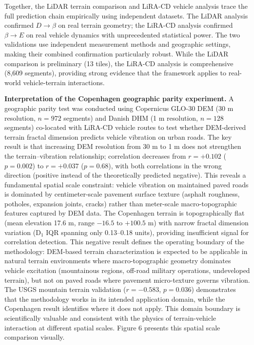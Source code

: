 \documentclass[11pt]{article}
\begin{document}
Together, the LiDAR terrain comparison and LiRA-CD vehicle analysis trace the full prediction chain empirically using independent datasets. The LiDAR analysis confirmed $D \rightarrow \beta$ on real terrain geometry; the LiRA-CD analysis confirmed $\beta \rightarrow E$ on real vehicle dynamics with unprecedented statistical power. The two validations use independent measurement methods and geographic settings, making their combined confirmation particularly robust. While the LiDAR comparison is preliminary (13 tiles), the LiRA-CD analysis is comprehensive (8,609 segments), providing strong evidence that the framework applies to real-world vehicle-terrain interactions.

\textbf{Interpretation of the Copenhagen geographic parity experiment.} A geographic parity test was conducted using Copernicus GLO-30 DEM (30 m resolution, $n=972$ segments) and Danish DHM (1 m resolution, $n=128$ segments) co-located with LiRA-CD vehicle routes to test whether DEM-derived terrain fractal dimension predicts vehicle vibration on urban roads. The key result is that increasing DEM resolution from 30 m to 1 m does not strengthen the terrain--vibration relationship; correlation decreases from $r = +0.102$ ($p = 0.002$) to $r = +0.037$ ($p = 0.68$), with both correlations in the wrong direction (positive instead of the theoretically predicted negative). This reveals a fundamental spatial scale constraint: vehicle vibration on maintained paved roads is dominated by centimeter-scale pavement surface texture (asphalt roughness, potholes, expansion joints, cracks) rather than meter-scale macro-topographic features captured by DEM data. The Copenhagen terrain is topographically flat (mean elevation 17.6 m, range $-16.5$ to $+100.5$ m) with narrow fractal dimension variation (D$_1$ IQR spanning only 0.13--0.18 units), providing insufficient signal for correlation detection. This negative result defines the operating boundary of the methodology: DEM-based terrain characterization is expected to be applicable in natural terrain environments where macro-topographic geometry dominates vehicle excitation (mountainous regions, off-road military operations, undeveloped terrain), but not on paved roads where pavement micro-texture governs vibration. The USGS mountain terrain validation ($r = -0.583$, $p = 0.036$) demonstrates that the methodology works in its intended application domain, while the Copenhagen result identifies where it does not apply. This domain boundary is scientifically valuable and consistent with the physics of terrain-vehicle interaction at different spatial scales. Figure 6 presents this spatial scale comparison visually.
\end{document}
